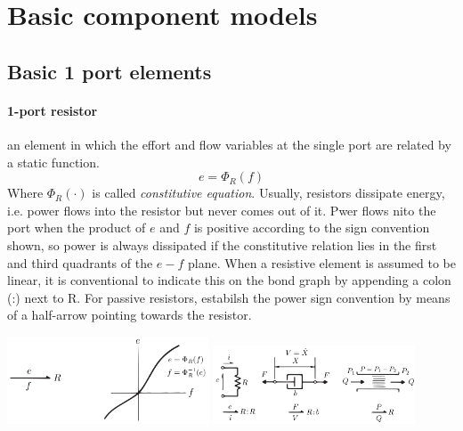 \documentclass{book}
\begin{document}
\chapter{Basic component models}

\section{Basic 1 port elements}
\subsubsection{1-port resistor}
an element in which the effort and flow variables at the single port are related by a static function.
\[
    e = \Phi_R(f)
\]
Where $\Phi_R(\cdot)$ is called \emph{constitutive equation}.
Usually, resistors dissipate energy, i.e. power flows into the resistor but never comes out of it. 
Pwer flows nito the port when the product of $e$ and $f$ is positive according to the sign convention shown, so power is always dissipated if the constitutive relation lies in the first and third quadrants of the $e-f$ plane.
When a resistive element is assumed to be linear, it is conventional to indicate this on the bond graph by appending a colon (:) next to R. For passive resistors, estabilsh the power sign convention by means of a half-arrow pointing towards the resistor.
\begin{center}
\includegraphics[width=0.45\textwidth]{1portR1}
\includegraphics[width=0.45\textwidth]{1portR2}
\end{center}
\end{document}
